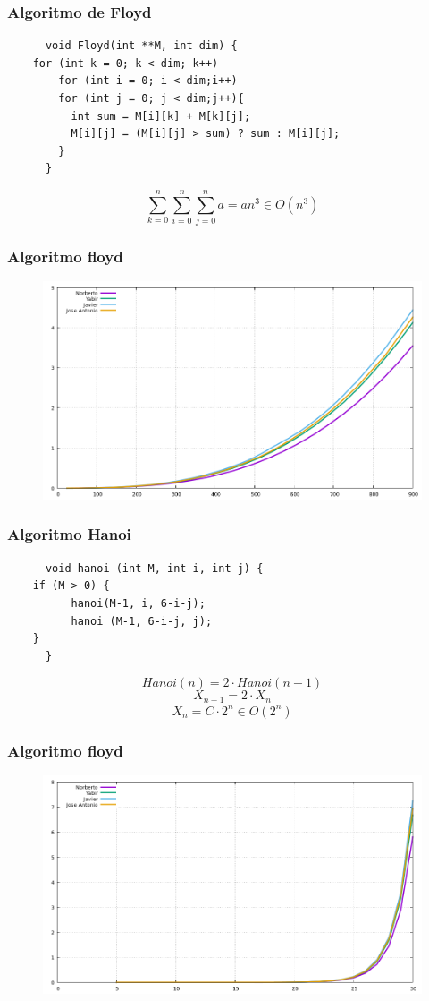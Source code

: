 \documentclass[spanish]{beamer}
\begin{document}
  \begin{frame}[fragile]\frametitle{Algoritmo de Floyd}
    \begin{lstlisting}
      void Floyd(int **M, int dim) {
	for (int k = 0; k < dim; k++)
        for (int i = 0; i < dim;i++)
        for (int j = 0; j < dim;j++){
          int sum = M[i][k] + M[k][j];
          M[i][j] = (M[i][j] > sum) ? sum : M[i][j];
        }
      }
    \end{lstlisting}

    $$\sum_{k=0}^{n} \sum_{i=0}^{n} \sum_{j=0}^{n} a = a n^3 \in O(n^3)$$
  \end{frame}

  \begin{frame}\frametitle{Algoritmo floyd}
  \begin{figure}[H]
    \centering   
        \includegraphics[clip,width=1\columnwidth]{../plots/floyd}%
    \end{figure}
  \end{frame}

   \begin{frame}[fragile]\frametitle{Algoritmo Hanoi}
    \begin{lstlisting}
      void hanoi (int M, int i, int j) {
	if (M > 0) {
          hanoi(M-1, i, 6-i-j);
          hanoi (M-1, 6-i-j, j);
	}
      }
    \end{lstlisting}

    $$Hanoi(n) = 2 \cdot Hanoi(n-1)$$
    $$X_{n+1} = 2 \cdot X_n$$
    $$X_n = C \cdot 2^n \in O(2^n)$$
  \end{frame}

  \begin{frame}\frametitle{Algoritmo floyd}
  \begin{figure}[H]
    \centering   
        \includegraphics[clip,width=1\columnwidth]{../plots/hanoi}%
    \end{figure}
  \end{frame}
\end{document}

